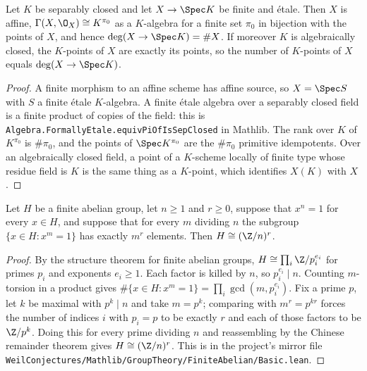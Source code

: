 \begin{proposition}
\label{prop:av-finite-etale-points}
\leanok
Let $K$ be separably closed and let $X\to\Spec K$ be finite and \'etale.  Then
$X$ is affine, $\Gamma(X,\O_X)\cong K^{\pi_0}$ as a $K$-algebra for a finite
set $\pi_0$ in bijection with the points of $X$, and hence
$\deg(X\to\Spec K)=\#X$.  If moreover $K$ is algebraically closed, the
$K$-points of $X$ are exactly its points, so the number of $K$-points of $X$
equals $\deg(X\to\Spec K)$.
\end{proposition}
\begin{proof}
\leanok
A finite morphism to an affine scheme has affine source, so $X=\Spec S$ with
$S$ a finite \'etale $K$-algebra.  A finite \'etale algebra over a separably
closed field is a finite product of copies of the field: this is
\texttt{Algebra.FormallyEtale.equivPiOfIsSepClosed} in Mathlib.  The rank over
$K$ of $K^{\pi_0}$ is $\#\pi_0$, and the points of $\Spec K^{\pi_0}$ are the
$\#\pi_0$ primitive idempotents.  Over an algebraically closed field, a point
of a $K$-scheme locally of finite type whose residue field is $K$ is the same
thing as a $K$-point, which identifies $X(K)$ with $X$.
\end{proof}

\begin{theorem}[Recognising $(\Z/n)^r$]\label{thm:av-finite-abelian-group}
\leanok
Let $H$ be a finite abelian group, let $n\geq1$ and $r\geq0$, suppose that
$x^n=1$ for every $x\in H$, and suppose that for every $m$ dividing $n$ the
subgroup $\{x\in H:x^m=1\}$ has exactly $m^r$ elements.  Then $H\cong(\Z/n)^r$.
\end{theorem}
\begin{proof}
\leanok
By the structure theorem for finite abelian groups, $H\cong\prod_i\Z/p_i^{e_i}$
for primes $p_i$ and exponents $e_i\geq1$.  Each factor is killed by $n$, so
$p_i^{e_i}\mid n$.  Counting $m$-torsion in a product gives
$\#\{x\in H:x^m=1\}=\prod_i\gcd(m,p_i^{e_i})$.  Fix a prime $p$, let $k$ be
maximal with $p^k\mid n$ and take $m=p^k$; comparing with $m^r=p^{kr}$ forces
the number of indices $i$ with $p_i=p$ to be exactly $r$ and each of those
factors to be $\Z/p^k$.  Doing this for every prime dividing $n$ and
reassembling by the Chinese remainder theorem gives $H\cong(\Z/n)^r$.  This is
in the project's mirror file
\texttt{WeilConjectures/Mathlib/GroupTheory/FiniteAbelian/Basic.lean}.
\end{proof}

